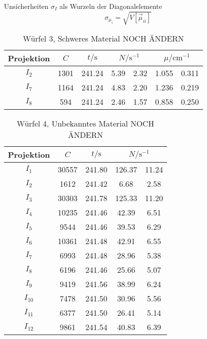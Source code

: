 Unsicherheiten $\sigma_I$ als Wurzeln der Diagonalelemente
\begin{equation*}
    \sigma_{\mu_i} = \sqrt{V[\vec{\mu}_{ii}]} 
\end{equation*}
\FloatBarrier
\begin{table}[h]
    \centering
    \caption{Würfel 3, Schweres Material NOCH ÄNDERN}
    \label{tab:W3}
    \begin{tabular}{c S[table-format=4.0] S[table-format=3.2] S[table-format=1.2]@{${}\pm{}$} S[table-format=1.2] S[table-format=1.3]@{${}\pm{}$} S[table-format=1.3]}
        \toprule
        {Projektion} & {$C$} & {$t/\si{\s}$} &  &  \\
        \midrule
        $I_2$ & 1301 & 241.24 & 5.39 & 2.32 & 1.055 & 0.311\\
        $I_7$ & 1164 & 241.24 & 4.83 & 2.20 & 1.236 & 0.219\\
        $I_8$ & 594  & 241.24 & 2.46 & 1.57 & 0.858 & 0.250\\
        \bottomrule
    \end{tabular}
\end{table}
\FloatBarrier
\noindent
\FloatBarrier
\begin{table}[h]
    \centering
    \caption{Würfel 4, Unbekanntes Material NOCH ÄNDERN}
    \label{tab:W4}
    \begin{tabular}{c S[table-format=5.0] S[table-format=3.2] S[table-format=3.2]@{${}\pm{}$} S[table-format=3.2]}
        \toprule
        {Projektion} & {$C$} & {$t/\si{\s}$} &  \\
        \midrule
        $I_1$    & 30557 & 241.80 & 126.37 & 11.24 \\
        $I_2$    & 1612  & 241.42 & 6.68   & 2.58  \\
        $I_3$    & 30303 & 241.78 & 125.33 & 11.20 \\
        $I_4$    & 10235 & 241.46 & 42.39  & 6.51  \\
        $I_5$    & 9544  & 241.46 & 39.53  & 6.29  \\
        $I_6$    & 10361 & 241.48 & 42.91  & 6.55  \\
        $I_7$    & 6993  & 241.48 & 28.96  & 5.38  \\
        $I_8$    & 6196  & 241.46 & 25.66  & 5.07  \\
        $I_9$    & 9419  & 241.56 & 38.99  & 6.24  \\
        $I_{10}$ & 7478  & 241.50 & 30.96  & 5.56  \\
        $I_{11}$ & 6377  & 241.50 & 26.41  & 5.14  \\
        $I_{12}$ & 9861  & 241.54 & 40.83  & 6.39  \\
        \bottomrule
    \end{tabular}
\end{table}
